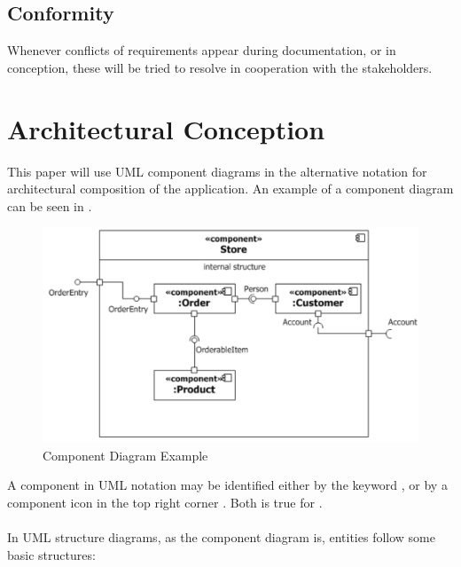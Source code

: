 \subsection{Conformity}
Whenever conflicts of requirements appear during documentation, or in conception, these will be tried to resolve in cooperation with the stakeholders. 

\section{Architectural Conception}
This paper will use UML component diagrams in the alternative notation \parencite[cf.][212]{ObjectManagementGroup.01.03.2015} for architectural composition of the application. An example of a component diagram can be seen in .

\begin{figure}[H]
    \centering
    \includegraphics[width=\textwidth]{img/componentExample.pdf}
    \caption[Component Diagram Example]{Component Diagram Example \parencites[2132]{ObjectManagementGroup.01.03.2015}}
    \label{fig:comEx}
\end{figure}

A component in UML notation may be identified either by the keyword , or by a component icon in the top right corner \parencites[cf.][208]{ObjectManagementGroup.01.03.2015}. Both is true for . 

\paragraph{} In UML structure diagrams, as the component diagram is, entities follow some basic structures:

